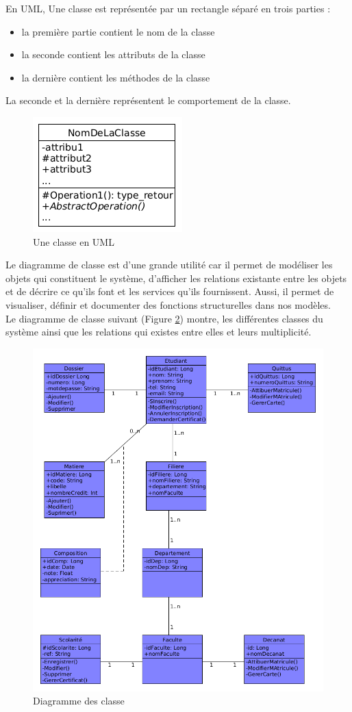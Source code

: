 \documentclass[12pt,a4paper]{article}
\begin{document}
	En UML, Une classe est représentée par un rectangle séparé en trois parties :
	\begin{itemize}
		\item la première partie contient le nom de la classe
		\item la seconde contient les attributs de la classe
		\item la dernière contient les méthodes de la classe
	\end{itemize}
	La seconde et la dernière représentent le comportement de la classe.
	\begin{figure}[H]
		\centering
		\includegraphics[width=.25\textwidth]{class}
		\caption{Une classe en UML}
		\label{fig:figure2}
	\end{figure}

	Le diagramme de classe est d'une grande utilité car il permet de modéliser les objets qui constituent le système, d'afficher les relations existante entre les objets et de décrire ce qu’ils font et les services qu’ils fournissent. Aussi, il permet de visualiser, définir et documenter des fonctions structurelles dans nos modèles.\\
	Le diagramme de classe suivant (Figure \ref{fig:figure4}) montre, les différentes classes du système ainsi que les relations qui existes entre elles et leurs multiplicité.
	
	\begin{figure}[H]
		\centering
		\includegraphics[width=\textwidth]{u_class_diag_1}
		\caption{Diagramme des classe}
		\label{fig:figure4}
	\end{figure}
\end{document}
